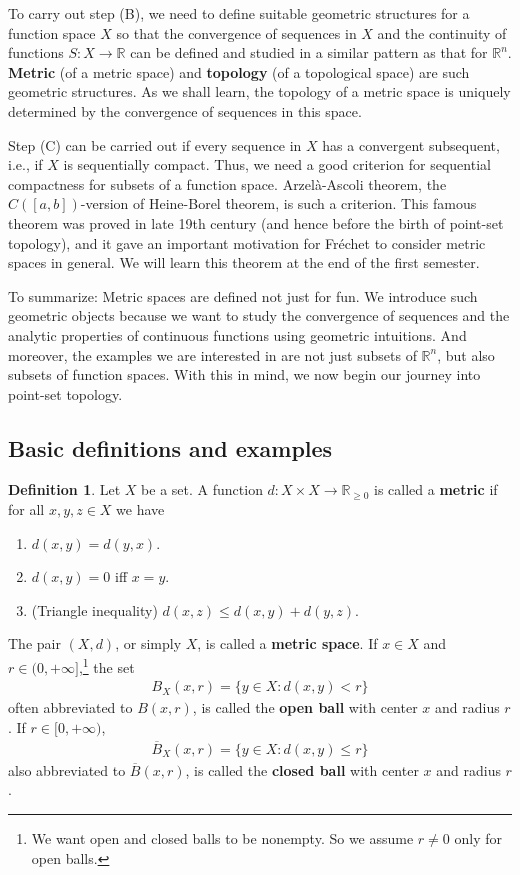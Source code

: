 \documentclass[12pt,b5paper,notitlepage]{article}
\theoremstyle{definition}
\newtheorem{df}{Definition}[section]
\theoremstyle{plain}
\newcommand{\ovl}{\overline}
\newcommand{\Rbb}{\mathbb R}
\numberwithin{equation}{section}
\begin{document}
To carry out step (B), we need to define suitable geometric structures for a function space $X$ so that the convergence of sequences in $X$ and the continuity of functions $S:X\rightarrow\Rbb$ can be defined and studied in a similar pattern as that for $\Rbb^n$. \textbf{Metric} (of a metric space) and \textbf{topology} (of a topological space) are such geometric structures. As we shall learn, the topology of a metric space is uniquely determined by the convergence of sequences in this space. 

Step (C) can be carried out if every sequence in $X$ has a convergent subsequent, i.e., if $X$ is sequentially compact. Thus, we need a good criterion for sequential compactness for subsets of a function space.  Arzel\`a-Ascoli theorem, the  $C([a,b])$-version of Heine-Borel theorem, is such a criterion. This famous theorem was proved in late 19th century (and hence before the birth of point-set topology), and it gave an important motivation for Fr\'echet to consider  metric spaces in general. We will learn this theorem at the end of the first semester.


To summarize: Metric spaces are defined not just for fun. We introduce such geometric objects because we want to study the convergence of sequences and the analytic properties of continuous functions using geometric intuitions. And moreover, the examples we are interested in are not just subsets of $\Rbb^n$, but also subsets of function spaces. With this in mind, we now begin our journey into point-set topology.


\subsection{Basic definitions and examples}



\begin{df}
Let $X$ be a set. A function $d:X\times X\rightarrow\Rbb_{\geq0}$ is called a \textbf{metric} if for all $x,y,z\in X$ we have
\begin{enumerate}[label=(\arabic*)]
\item $d(x,y)=d(y,x)$.
\item $d(x,y)=0$ iff $x=y$.
\item (Triangle inequality)  $d(x,z)\leq d(x,y)+d(y,z)$.
\end{enumerate}
The pair $(X,d)$, or simply $X$, is called  a \textbf{metric space}. If $x\in X$ and $r\in(0,+\infty]$,\footnote{We want open and closed balls to be nonempty. So we assume $r\neq0$ only for open balls.} the set \index{Br@$B_X(x,r)=B(x,r)$ and $\ovl B_X(x,r)=\ovl B(x,r)$}
\begin{align*}
B_X(x,r)=\{y\in X:d(x,y)<r\}
\end{align*}
often abbreviated to $B(x,r)$, is called the \textbf{open ball} with center $x$ and radius $r$. If $r\in[0,+\infty)$,
\begin{align*}
\ovl B_X(x,r)=\{y\in X:d(x,y)\leq r\}
\end{align*}
also abbreviated to $\ovl B(x,r)$, is called the \textbf{closed ball} with center $x$ and radius $r$.
\end{df}
\end{document}
